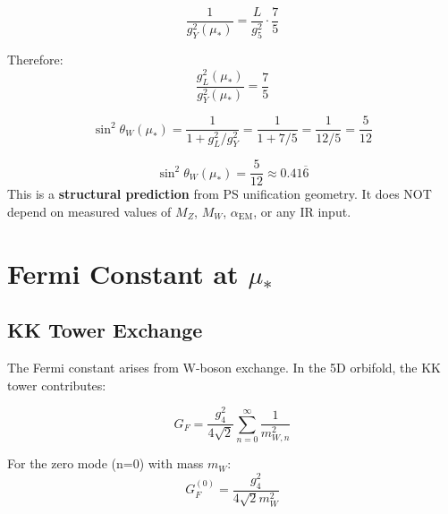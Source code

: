 \documentclass[11pt,a4paper]{article}
\theoremstyle{definition}
\begin{document}
\begin{equation}
\label{eq:gY_unified}
\frac{1}{g_Y^2(\mu_*)} = \frac{L}{g_5^2} \cdot \frac{7}{5}
\end{equation}

Therefore:
\begin{equation}
\label{eq:ratio}
\frac{g_L^2(\mu_*)}{g_Y^2(\mu_*)} = \frac{7}{5}
\end{equation}

\begin{equation}
\label{eq:sw2_derivation}
\sin^2\theta_W(\mu_*) = \frac{1}{1 + g_L^2/g_Y^2} = \frac{1}{1 + 7/5} = \frac{1}{12/5} = \frac{5}{12}
\end{equation}

\begin{predictionbox}
\begin{equation}
\label{eq:sw2_prediction}
\sin^2\theta_W(\mu_*) = \frac{5}{12} \approx 0.41\overline{6}
\end{equation}
This is a \textbf{structural prediction} from PS unification geometry.
It does NOT depend on measured values of $M_Z$, $M_W$, $\alpha_{\text{EM}}$, or any IR input.
\end{predictionbox}

\section{Fermi Constant at $\mu_*$}
\label{sec:GF}

\subsection{KK Tower Exchange}
\label{subsec:kk_exchange}

The Fermi constant arises from W-boson exchange. In the 5D orbifold, the KK tower contributes:

\begin{equation}
\label{eq:GF_kk_sum}
G_F = \frac{g_4^2}{4\sqrt{2}} \sum_{n=0}^{\infty} \frac{1}{m_{W,n}^2}
\end{equation}

For the zero mode (n=0) with mass $m_W$:
\begin{equation}
\label{eq:GF_zero}
G_F^{(0)} = \frac{g_4^2}{4\sqrt{2} m_W^2}
\end{equation}
\end{document}
